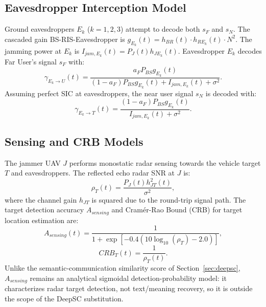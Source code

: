 \documentclass[journal,onecolumn]{IEEEtran}
\begin{document}
\subsection{Eavesdropper Interception Model}
Ground eavesdroppers $E_k$ ($k=1,2,3$) attempt to decode both $s_F$ and $s_N$. The cascaded gain BS-RIS-Eavesdropper is $g_{E_k}(t) = h_{BR}(t) \cdot h_{RE_k}(t) \cdot N^2$. The jamming power at $E_k$ is $I_{jam, E_k}(t) = P_J(t) h_{JE_k}(t)$. Eavesdropper $E_k$ decodes Far User's signal $s_F$ with:
\begin{equation}
    \gamma_{E_k \to U}(t) = \frac{a_F P_{BS} g_{E_k}(t)}{(1 - a_F) P_{BS} g_{E_k}(t) + I_{jam, E_k}(t) + \sigma^2}.
\end{equation}
Assuming perfect SIC at eavesdroppers, the near user signal $s_N$ is decoded with:
\begin{equation}
    \gamma_{E_k \to T}(t) = \frac{(1 - a_F) P_{BS} g_{E_k}(t)}{I_{jam, E_k}(t) + \sigma^2}.
\end{equation}

\subsection{Sensing and CRB Models}
The jammer UAV $J$ performs monostatic radar sensing towards the vehicle target $T$ and eavesdroppers. The reflected echo radar SNR at $J$ is:
\begin{equation}
    \rho_T(t) = \frac{P_J(t) h_{JT}^2(t)}{\sigma^2},
\end{equation}
where the channel gain $h_{JT}$ is squared due to the round-trip signal path. The target detection accuracy $A_{sensing}$ and Cram\'{e}r-Rao Bound (CRB) for target location estimation are:
\begin{equation}
    A_{sensing}(t) = \frac{1}{1 + \exp\left[-0.4\left(10\log_{10}(\rho_T) - 2.0\right)\right]},
\end{equation}
\begin{equation}
    CRB_T(t) = \frac{1}{\rho_T(t)}.
\end{equation}
Unlike the semantic-communication similarity score of Section~\ref{sec:deepsc}, $A_{sensing}$ remains an analytical sigmoidal detection-probability model: it characterizes radar target detection, not text/meaning recovery, so it is outside the scope of the DeepSC substitution.
\end{document}
